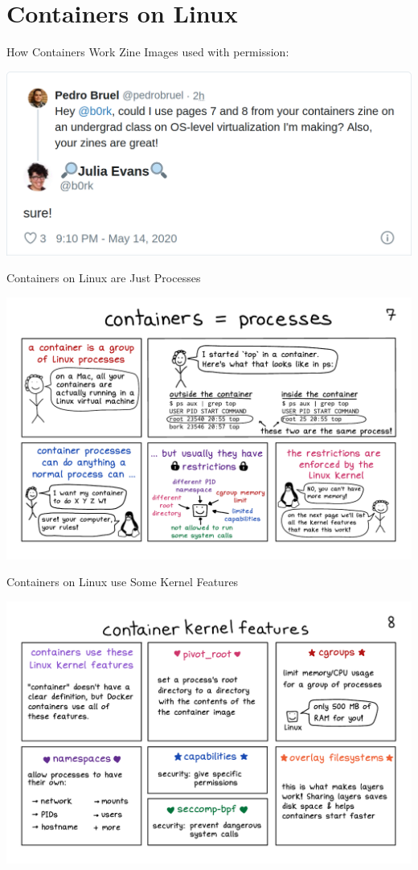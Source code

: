 \documentclass[10pt, compress, aspectratio=169, xcolor={table,usenames,dvipsnames}]{beamer}
\begin{document}
\section{Containers on Linux}
\label{sec:orgda21be7}
\begin{frame}[label={sec:org911e8ac}]{How Containers Work Zine}
Images used \alert{with permission}:
\begin{center}
\includegraphics[width=.72\columnwidth]{../../img/hcw_permission_twitter.png}
\end{center}
\end{frame}
\begin{frame}[label={sec:org7be6430}]{Containers on Linux are Just Processes}
\begin{center}
\includegraphics[width=.86\columnwidth]{../../img/how-containers-work_pg7.pdf}
\end{center}
\end{frame}
\begin{frame}[label={sec:org4de3152}]{Containers on Linux use Some Kernel Features}
\begin{center}
\includegraphics[width=.86\columnwidth]{../../img/how-containers-work_pg8.pdf}
\end{center}
\end{frame}
\end{document}
